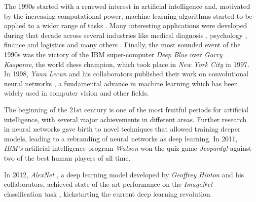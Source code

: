 The 1990s started with a renewed interest in artificial intelligence and, motivated by the increasing computational power, machine learning algorithms started to be applied to a wider range of tasks \autocite{Tesauro:1995}. Many interesting applications were developed during that decade across several industries like medical diagnosis \autocite{declaris1991, Klein1991, punch1992, Cinar1999}, psychology \autocite{Dorrer1995, denby1999, Ogawa1999, Perlovsky1999}, finance and logistics \autocite{Lipshutz1991, Benaroch1991, Johnson1991, Falas1994} and many others \autocite{Smithers1993, Yoo1994, Mashaly1994, Koyma1998}. Finally, the most sounded event of the 1990s was the victory of the IBM super-computer \textit{Deep Blue} \autocite{Campbell2002} over \textit{Garry Kasparov}, the world chess champion, which took place in \textit{New York City} in 1997. In 1998, \textit{Yann Lecun} and his collaborators published their work on convolutional neural networks \autocite{lecun1999}, a fundamental advance in machine learning which has been widely used in computer vision and other fields. 

The beginning of the 21st century is one of the most fruitful periods for artificial intelligence, with several major achievements in different areas. Further research in neural networks \autocite{hinton2006, hinton2012} gave birth to novel techniques that allowed training deeper models, leading to a rebranding of neural networks as deep learning. In 2011, \textit{IBM's} artificial intelligence program \textit{Watson} won the quiz game \textit{Jeopardy!} against two of the best human players of all time. 

In 2012, \textit{AlexNet} \autocite{krizhevsky2012}, a deep learning model developed by \textit{Geoffrey Hinton} and his collaborators, achieved state-of-the-art performance on the \textit{ImageNet} classification task \autocite{ILSVRC15}, kickstarting the current deep learning revolution. 

